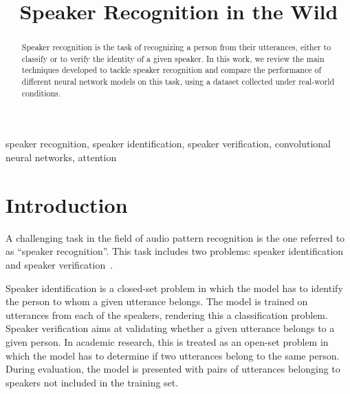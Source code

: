 \documentclass[conference]{IEEEtran}
\begin{document}
\title{Speaker Recognition in the Wild\\}

\author{
}

\maketitle

\begin{abstract}
Speaker recognition is the task of recognizing a person from their utterances, either to classify or to verify the identity of a given speaker. In this work, we review the main techniques developed to tackle speaker recognition and compare the performance of different neural network models on this task, using a dataset collected under real-world conditions.  
\end{abstract}

\begin{IEEEkeywords}
speaker recognition, speaker identification, speaker verification, convolutional neural networks, attention
\end{IEEEkeywords}

\section{Introduction}

A challenging task in the field of audio pattern recognition is the one referred to as ``speaker recognition''. This task includes two problems: speaker identification and speaker verification~\cite{kabir2021survey,hajibabaei2018unified,chung2020defence}. 

Speaker identification is a closed-set problem in which the model has to identify the person to whom a given utterance belongs. The model is trained on utterances from each of the speakers, rendering this a classification problem. Speaker verification aims at validating whether a given utterance belongs to a given person. In academic research, this is treated as an open-set problem in which the model has to determine if two utterances belong to the same person. During evaluation, the model is presented with pairs of utterances belonging to speakers not included in the training set.
\end{document}
